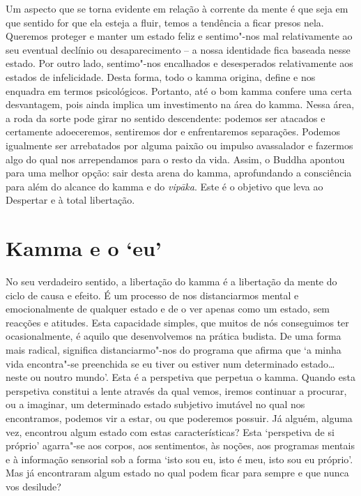 Um aspecto que se torna evidente em relação à corrente da mente é que seja em
que sentido for que ela esteja a fluir, temos a tendência a ficar presos nela.
Queremos proteger e manter um estado feliz e sentimo"-nos mal relativamente ao
seu eventual declínio ou desaparecimento -- a nossa identidade fica baseada
nesse estado. Por outro lado, sentimo"-nos encalhados e desesperados
relativamente aos estados de infelicidade. Desta forma, todo o kamma origina,
define e nos enquadra em termos psicológicos. Portanto, até o bom kamma confere
uma certa desvantagem, pois ainda implica um investimento na área do kamma.
Nessa área, a roda da sorte pode girar no sentido descendente: podemos ser
atacados e certamente adoeceremos, sentiremos dor e enfrentaremos separações.
Podemos igualmente ser arrebatados por alguma paixão ou impulso avassalador e
fazermos algo do qual nos arrependamos para o resto da vida. Assim, o Buddha
apontou para uma melhor opção: sair desta arena do kamma, aprofundando a
consciência para além do alcance do kamma e do \emph{vipāka}. Este é o objetivo
que leva ao Despertar e à total libertação.

\section{Kamma e o `eu\kern -0.5pt'}

No seu verdadeiro sentido, a libertação do kamma é a libertação da mente do
ciclo de causa e efeito. É um processo de nos distanciarmos mental e
emocionalmente de qualquer estado e de o ver apenas como um estado, sem reacções
e atitudes. Esta capacidade simples, que muitos de nós conseguimos ter
ocasionalmente, é aquilo que desenvolvemos na prática budista. De uma forma mais
radical, significa distanciarmo"-nos do programa que afirma que `a minha vida
encontra"-se preenchida se eu tiver ou estiver num determinado estado\ldots{}
neste ou noutro mundo'. Esta é a perspetiva que perpetua o kamma. Quando esta
perspetiva constitui a lente através da qual vemos, iremos continuar a procurar,
ou a imaginar, um determinado estado subjetivo imutável no qual nos encontramos,
podemos vir a estar, ou que poderemos possuir. Já alguém, alguma vez, encontrou
algum estado com estas características? Esta `perspetiva de si próprio'
agarra"-se aos corpos, aos sentimentos, às noções, aos programas mentais e à
informação sensorial sob a forma `isto sou eu, isto é meu, isto sou eu próprio'.
Mas já encontraram algum estado no qual podem ficar para sempre e que nunca vos
desilude?

